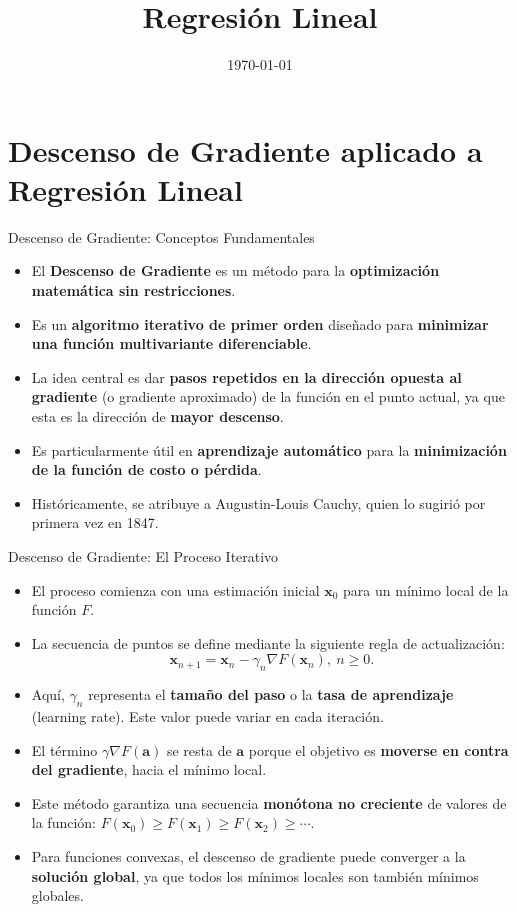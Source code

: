 \documentclass{beamer}
\title{Regresión Lineal}
\date{\today}
\begin{document}
\begin{frame}
    \titlepage
\end{frame}

\section{Descenso de Gradiente aplicado a Regresión Lineal}

\begin{frame}{Descenso de Gradiente: Conceptos Fundamentales}
    \begin{itemize}
        \item El \textbf{Descenso de Gradiente} es un método para la \textbf{optimización matemática sin restricciones}.
        \item Es un \textbf{algoritmo iterativo de primer orden} diseñado para \textbf{minimizar una función multivariante diferenciable}.
        \item La idea central es dar \textbf{pasos repetidos en la dirección opuesta al gradiente} (o gradiente aproximado) de la función en el punto actual, ya que esta es la dirección de \textbf{mayor descenso}.
        \item Es particularmente útil en \textbf{aprendizaje automático} para la \textbf{minimización de la función de costo o pérdida}.
        \item Históricamente, se atribuye a Augustin-Louis Cauchy, quien lo sugirió por primera vez en 1847.
    \end{itemize}
\end{frame}

\begin{frame}{Descenso de Gradiente: El Proceso Iterativo}
    \begin{itemize}
        \item El proceso comienza con una estimación inicial $\mathbf{x}_{0}$ para un mínimo local de la función $F$.
        \item La secuencia de puntos se define mediante la siguiente regla de actualización:
            $$ \mathbf{x}_{n+1}=\mathbf{x}_{n}-\gamma_{n}\nabla F(\mathbf{x}_{n}),\ n\geq 0. $$
        \item Aquí, $\gamma_{n}$ representa el \textbf{tamaño del paso} o la \textbf{tasa de aprendizaje} (learning rate). Este valor puede variar en cada iteración.
        \item El término $\gamma \nabla F(\mathbf{a})$ se resta de $\mathbf{a}$ porque el objetivo es \textbf{moverse en contra del gradiente}, hacia el mínimo local.
        \item Este método garantiza una secuencia \textbf{monótona no creciente} de valores de la función: $F(\mathbf{x}_{0})\geq F(\mathbf{x}_{1})\geq F(\mathbf{x}_{2})\geq \cdots$.
        \item Para funciones convexas, el descenso de gradiente puede converger a la \textbf{solución global}, ya que todos los mínimos locales son también mínimos globales.
    \end{itemize}
\end{frame}
\end{document}
